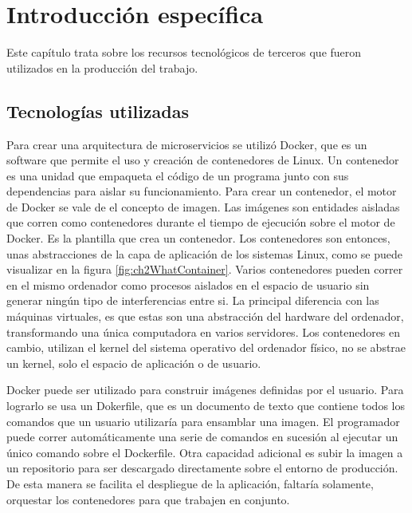 \chapter{Introducción específica} %

\label{Chapter2}

Este capítulo trata sobre los recursos tecnológicos de terceros que fueron utilizados en la producción del trabajo.

\section{Tecnologías utilizadas}

Para crear una arquitectura de microservicios se utilizó Docker, que es un software que permite el uso y creación de contenedores de Linux.
Un contenedor es una unidad que empaqueta el código de un programa junto con sus dependencias para aislar su funcionamiento.
Para crear un contenedor, el motor de Docker se vale de el concepto de imagen.
Las imágenes son entidades aisladas que corren como contenedores durante el tiempo de ejecución sobre el motor de Docker.
Es la plantilla que crea un contenedor.
Los contenedores son entonces, unas abstracciones de la capa de aplicación de los sistemas Linux, como se puede visualizar en la figura \ref{fig:ch2WhatContainer}.
Varios contenedores pueden correr en el mismo ordenador como procesos aislados en el espacio de usuario sin generar ningún tipo de interferencias entre si.
La principal diferencia con las máquinas virtuales, es que estas son una abstracción del hardware del ordenador, transformando una única computadora en varios servidores.
Los contenedores en cambio, utilizan el kernel del sistema operativo del ordenador físico, no se abstrae un kernel, solo el espacio de aplicación o de usuario.

Docker puede ser utilizado para construir imágenes definidas por el usuario.
Para lograrlo se usa un Dokerfile, que es un documento de texto que contiene todos los comandos que un usuario utilizaría para ensamblar una imagen.
El programador puede correr automáticamente una serie de comandos en sucesión al ejecutar un único comando sobre el Dockerfile.
Otra capacidad adicional es subir la imagen a un repositorio para ser descargado directamente sobre el entorno de producción.
De esta manera se facilita el despliegue de la aplicación, faltaría solamente, orquestar los contenedores para que trabajen en conjunto. 

